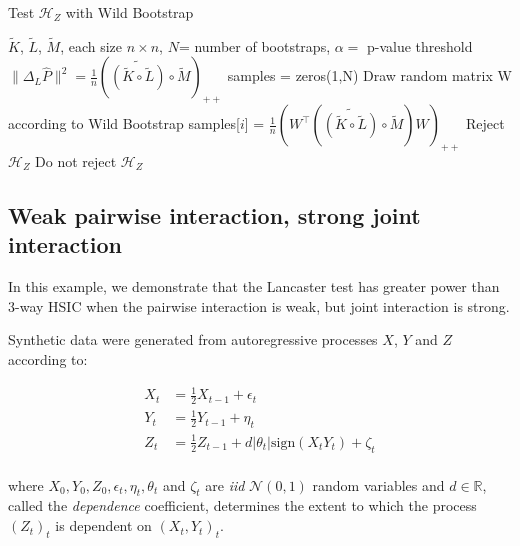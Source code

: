 \documentclass[]{article}
\begin{document}
\begin{algorithm}[tb]
   \caption{Test $\mathcal{H}_Z$ with Wild Bootstrap}
   \label{alg:Lancaster}
\begin{algorithmic}
    $\tilde{K}$, $\tilde{L}$, $\tilde{M}$, each size $n\times n$, $N$= number of bootstraps, $\alpha=$ p-value threshold
   \STATE $\|\Delta_L\hat{P}\|^2 = \frac{1}{n}\left(\widetilde{\left( \tilde{K} \circ \tilde{L}\right) }\circ \tilde{M} \right)_{++}$
   \STATE samples = zeros(1,N)
   \STATE Draw random matrix W according to Wild Bootstrap
   \STATE samples[$i$] = $\frac{1}{n}\left(W^\intercal\left( \widetilde{\left( \tilde{K} \circ \tilde{L}\right) }\circ \tilde{M} \right)W\right) _{++}$
   \ENDFOR
   \STATE Reject $\mathcal{H}_Z$
   \ELSE
   \STATE Do not reject $\mathcal{H}_Z$
   \ENDIF
\end{algorithmic}
\end{algorithm}

\subsection{Weak pairwise interaction, strong joint interaction}\label{experiment1}

In this example, we demonstrate that the Lancaster test has greater power than 3-way HSIC when the pairwise interaction is weak, but joint interaction is strong.


Synthetic data were generated from autoregressive processes $X$, $Y$ and $Z$ according to:

\begin{align*}
X_t &= \frac{1}{2}X_{t-1} + \epsilon_t\\
Y_t &= \frac{1}{2}Y_{t-1} + \eta_t\\
Z_t &= \frac{1}{2}Z_{t-1} + d |\theta_t|\text{sign}(X_t Y_t) + \zeta_t\\
\end{align*}

where $X_0, Y_0, Z_0, \epsilon_t, \eta_t, \theta_t$ and $\zeta_t$ are \emph{iid} $\mathcal{N}(0,1)$ random variables and $d\in\mathbb{R}$, called the \emph{dependence} coefficient, determines the extent to which the process $(Z_t)_t$ is dependent on $(X_t,Y_t)_t$.
\end{document}
